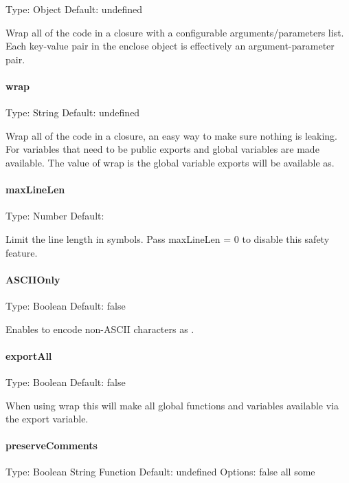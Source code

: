 Type\+: {\ttfamily Object} Default\+: {\ttfamily undefined}

Wrap all of the code in a closure with a configurable arguments/parameters list. Each key-\/value pair in the {\ttfamily enclose} object is effectively an argument-\/parameter pair.

\paragraph*{wrap}

Type\+: {\ttfamily String} Default\+: {\ttfamily undefined}

Wrap all of the code in a closure, an easy way to make sure nothing is leaking. For variables that need to be public {\ttfamily exports} and {\ttfamily global} variables are made available. The value of wrap is the global variable exports will be available as.

\paragraph*{max\+Line\+Len}

Type\+: {\ttfamily Number} Default\+: {}

Limit the line length in symbols. Pass max\+Line\+Len = 0 to disable this safety feature.

\paragraph*{A\+S\+C\+I\+I\+Only}

Type\+: {\ttfamily Boolean} Default\+: {\ttfamily false}

Enables to encode non-\/\+A\+S\+C\+II characters as .

\paragraph*{export\+All}

Type\+: {\ttfamily Boolean} Default\+: {\ttfamily false}

When using {\ttfamily wrap} this will make all global functions and variables available via the export variable.

\paragraph*{preserve\+Comments}

Type\+: {\ttfamily Boolean} {\ttfamily String} {\ttfamily Function} Default\+: {\ttfamily undefined} Options\+: {\ttfamily false} {\ttfamily \textquotesingle{}all\textquotesingle{}} {\ttfamily \textquotesingle{}some\textquotesingle{}}

